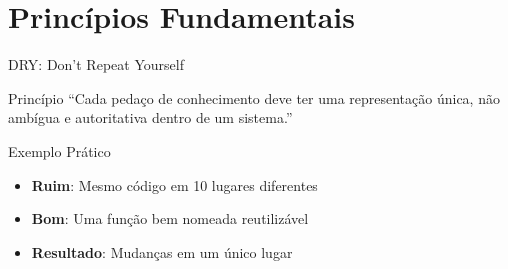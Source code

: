 \documentclass[10pt, aspectratio=169]{beamer}
\begin{document}
\section{Princípios Fundamentais}
\begin{frame}{DRY: Don't Repeat Yourself}
\begin{block}{Princípio}
``Cada pedaço de conhecimento deve ter uma representação única, não ambígua e autoritativa dentro de um sistema.''
\end{block}

\begin{exampleblock}{Exemplo Prático}
\begin{itemize}
    \item \textbf{Ruim}: Mesmo código em 10 lugares diferentes
    \item \textbf{Bom}: Uma função bem nomeada reutilizável
    \item \textbf{Resultado}: Mudanças em um único lugar
\end{itemize}
\end{exampleblock}

\begin{center}
\end{center}
\end{frame}
\end{document}
